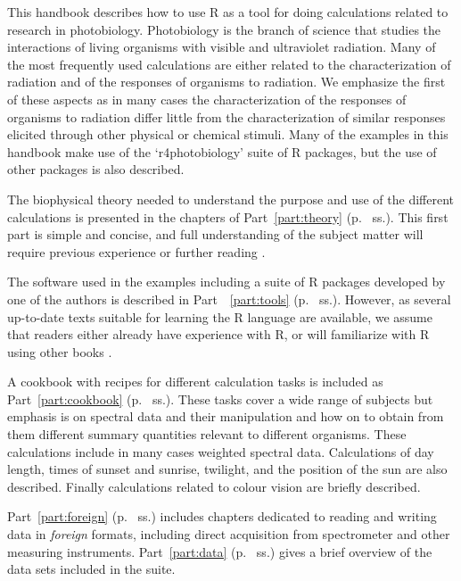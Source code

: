 This handbook describes how to use R as a tool for doing calculations related to research in photobiology. Photobiology is the branch of science that studies the interactions of living organisms with visible and ultraviolet radiation. Many of the most frequently used calculations are either related to the characterization of radiation and of the responses of organisms to radiation. We emphasize the first of these aspects as in many cases the characterization of the responses of organisms to radiation differ little from the characterization of similar responses elicited through other physical or chemical stimuli.
Many of the examples in this handbook make use of the `r4photobiology'  suite of R packages, but the use of other packages is also described.

The biophysical theory needed to understand the purpose and use of the different calculations is presented in the chapters of Part~\ref{part:theory} (p.~\pageref{part:theory} ss.). This first part is simple and concise, and full understanding of the subject matter will require previous experience or further reading \autocite[e.g.][]{Aphalo2012,Bjoern2015}.

The software used in the examples including a suite of R packages developed by one of the authors is described in Part~~\ref{part:tools} (p.~\pageref{part:tools} ss.). However, as several up-to-date texts suitable for learning the R language are available, we assume that readers either already have experience with R, or will familiarize with R using other books \autocite[e.g.][]{Aphalo2016,Horton2015a,Paradis2005,Peng2016}.

A cookbook with recipes for different calculation tasks is included as Part~\ref{part:cookbook} (p.~\pageref{part:cookbook} ss.). These tasks cover a wide range of subjects but emphasis is on spectral data and their manipulation and how on to obtain from them different summary quantities relevant to different organisms. These calculations include in many cases weighted spectral data. Calculations of day length, times of sunset and sunrise, twilight, and the position of the sun are also described. Finally calculations related to colour vision are briefly described.

Part~\ref{part:foreign} (p.~\pageref{part:foreign} ss.) includes chapters dedicated to reading and writing data in \emph{foreign} formats, including direct acquisition from spectrometer and other measuring instruments. Part~\ref{part:data} (p.~\pageref{part:data} ss.) gives a brief overview of the data sets included in the suite.

